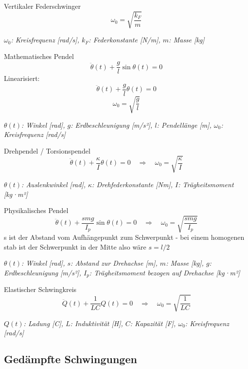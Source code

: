 \documentclass[a4paper,10pt]{article}
\newenvironment{displayformula}
{
	\begin{framed}
		\color{formulaColor}
	}
	{\end{framed}}
\newcommand{\formulalegend}[1]{%
	\par\vspace{0.5ex}%
	{{\color{legendColor}\RaggedRight\small\textit{#1}}}%
	\par\vspace{1.5ex}%
}
\begin{document}
\begin{displayformula}
	Vertikaler Federschwinger
	\[
	\omega_0 = \sqrt{\frac{k_F}{m}}
	\]
\end{displayformula}
\formulalegend{
	\( \omega_0 \): Kreisfrequenz [rad/s], \( k_F \): Federkonstante [N/m], \( m \): Masse [kg]
}

\begin{displayformula}
	Mathematisches Pendel
	\[
	\ddot{\theta}(t) + \frac{g}{l} \sin\theta(t) = 0
	\]
	Linearisiert:
	\[
	\ddot{\theta}(t) + \frac{g}{l} \theta(t) = 0
	\]
	\[
	\omega_0 = \sqrt{\frac{g}{l}}
	\]
\end{displayformula}
\formulalegend{
	\( \theta(t) \): Winkel [rad], \( g \): Erdbeschleunigung [m/s²], \( l \): Pendellänge [m], \( \omega_0 \): Kreisfrequenz [rad/s]
}

\begin{displayformula}
	Drehpendel / Torsionspendel
	\[
	\ddot{\theta}(t) + \frac{\kappa}{I} \theta(t) = 0
	\quad \Rightarrow \quad \omega_0 = \sqrt{\frac{\kappa}{I}}
	\]
\end{displayformula}
\formulalegend{
	\( \theta(t) \): Auslenkwinkel [rad], \( \kappa \): Drehfederkonstante [Nm], \( I \): Trägheitsmoment [kg·m²]
}

\begin{displayformula}
	Physikalisches Pendel
	\[
	\ddot{\theta}(t) + \frac{s m g}{I_p} \sin\theta(t) = 0
	\quad \Rightarrow \quad \omega_0 = \sqrt{\frac{s m g}{I_p}}
	\]
	s ist der Abstand vom Aufhängepunkt zum Schwerpunkt - bei einem homogenen stab ist der Schwerpunkt in der Mitte also wäre $s = l/2$
\end{displayformula}
\formulalegend{
	\( \theta(t) \): Winkel [rad], \( s \): Abstand zur Drehachse [m], \( m \): Masse [kg], \( g \): Erdbeschleunigung [m/s²], \( I_p \): Trägheitsmoment bezogen auf Drehachse [kg·m²]
}

\begin{displayformula}
	Elastischer Schwingkreis
	\[
	\ddot{Q}(t) + \frac{1}{LC} Q(t) = 0
	\quad \Rightarrow \quad \omega_0 = \sqrt{\frac{1}{LC}}
	\]
\end{displayformula}
\formulalegend{
	\( Q(t) \): Ladung [C], \( L \): Induktivität [H], \( C \): Kapazität [F], \( \omega_0 \): Kreisfrequenz [rad/s]
}

\newpage

\subsection{Gedämpfte Schwingungen}
\end{document}
